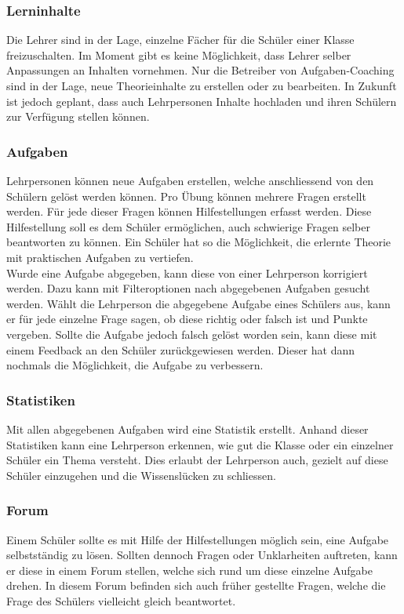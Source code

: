\subsubsection*{Lerninhalte}
Die Lehrer sind in der Lage, einzelne Fächer für die Schüler einer Klasse freizuschalten. Im Moment gibt es keine Möglichkeit, dass Lehrer selber Anpassungen an Inhalten vornehmen. Nur die Betreiber von Aufgaben-Coaching sind in der Lage, neue Theorieinhalte zu erstellen oder zu bearbeiten. In Zukunft ist jedoch geplant, dass auch Lehrpersonen Inhalte hochladen und ihren Schülern zur Verfügung stellen können.

\subsubsection*{Aufgaben}
Lehrpersonen können neue Aufgaben erstellen, welche anschliessend von den Schülern gelöst werden können. Pro Übung können mehrere Fragen erstellt werden. Für jede dieser Fragen können Hilfestellungen erfasst werden. Diese Hilfestellung soll es dem Schüler ermöglichen, auch schwierige Fragen selber beantworten zu können. Ein Schüler hat so die Möglichkeit, die erlernte Theorie mit praktischen Aufgaben zu vertiefen. \\

Wurde eine Aufgabe abgegeben, kann diese von einer Lehrperson korrigiert werden. Dazu kann mit Filteroptionen nach abgegebenen Aufgaben gesucht werden. Wählt die Lehrperson die abgegebene Aufgabe eines Schülers aus, kann er für jede einzelne Frage sagen, ob diese richtig oder falsch ist und Punkte vergeben. Sollte die Aufgabe jedoch falsch gelöst worden sein, kann diese mit einem Feedback an den Schüler zurückgewiesen werden. Dieser hat dann nochmals die Möglichkeit, die Aufgabe zu verbessern. 

\subsubsection*{Statistiken}
Mit allen abgegebenen Aufgaben wird eine Statistik erstellt. Anhand dieser Statistiken kann eine Lehrperson erkennen, wie gut die Klasse oder ein einzelner Schüler ein Thema versteht. Dies erlaubt der Lehrperson auch, gezielt auf diese Schüler einzugehen und die Wissenslücken zu schliessen.

\subsubsection*{Forum}
Einem Schüler sollte es mit Hilfe der Hilfestellungen möglich sein, eine Aufgabe selbstständig zu lösen. Sollten dennoch Fragen oder Unklarheiten auftreten, kann er diese in einem Forum stellen, welche sich rund um diese einzelne Aufgabe drehen. In diesem Forum befinden sich auch früher gestellte Fragen, welche die Frage des Schülers vielleicht gleich beantwortet.

